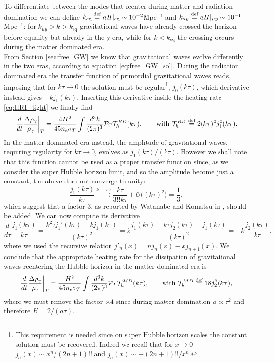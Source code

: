 To differentiate between the modes that reenter during matter and radiation domination we can define $k_\text{eq}\stackrel{\text{def}}{=} aH|_\text{eq}\sim 10^{-2}$Mpc$^{-1}$ and $k_{\mu y}\stackrel{\text{def}}{=} aH|_{\mu y}\sim 10^{-1}$Mpc$^{-1}$: for $k_{\mu y}>k>k_\text{eq}$ gravitational waves have already crossed the horizon before equality but already in the y-era, while for $k<k_\text{eq}$ the crossing occurs during the matter dominated era.\\ From Section \ref{sec:free_GW} we know that gravitational waves evolve differently in the two eras, according to equation \eqref{eq:free_GW_sol}. During the radiation dominated era the transfer function of primordial gravitational waves reads, imposing that for $k\tau\to0$ the solution must be regular\footnote{This requirement is needed since on super Hubble horizon scales the constant solution must be recovered. Indeed we recall that for $x\to0$ $j_n(x)\sim x^{n}/(2n+1)!!$ and $j_n(x)\sim -(2n+1)!!/x^{n}$.}, $ j_0(k\tau)$, which derivative
instead gives $-kj_1(k\tau)$. Inserting this derivative inside the heating rate \eqref{eq:HRI_tight} we finally find
\begin{equation}
    \frac{d}{dt}\frac{\Delta\rho_\gamma}{\rho_\gamma}\bigg|_T=\frac{4H^2}{45n_e\sigma_T}\int\frac{d^3k}{(2\pi)^3}\mathcal{P}_T\mathcal{T}_h^{RD}(k\tau),\qquad\text{with }\mathcal{T}_h^{RD}\stackrel{\text{def}}{=} 2(k\tau)^2j_1^2(k\tau).
\end{equation}
In the matter dominated era instead, the amplitude of gravitational waves, requiring regularity for $k\tau\to0$, evolves as $j_1(k\tau)/(k\tau)$.
However we shall note that this function cannot be used as a proper transfer function since, as we consider the super Hubble horizon limit, and so the amplitude become just a constant, the above does not converge to unity:
$$\frac{j_1(k\tau)}{k\tau}\xrightarrow{k\tau\to0}\frac{k\tau}{3!!k\tau}+\mathcal{O}\big((k\tau)^2\big)=\frac{1}{3},$$
which suggest that a factor $3$, as reported by Watanabe and Komatsu in \cite{Watanabe_2006}, should be added.  
We can now compute its derivative
$$\frac{d}{d\tau}\frac{j_1(k\tau)}{k\tau}=\frac{k^2\tau j_1'(k\tau)-kj_1(k\tau)}{(k\tau)^2}=k\frac{j_1(k\tau)-k\tau j_2(k\tau)-j_1(k\tau)}{(k\tau)^2}=-k \frac{j_2(k\tau)}{k\tau},$$
where we used the recursive relation $j'_n(x)=n j_n(x)-xj_{n+1}(x)$. We conclude that the appropriate heating rate for the dissipation of gravitational waves reentering the Hubble horizon in the matter dominated era is 
\begin{equation}
    \frac{d}{dt}\frac{\Delta\rho_\gamma}{\rho_\gamma}\bigg|_T=\frac{H^2}{45n_e\sigma_T}\int\frac{d^3k}{(2\pi)^3}\mathcal{P}_T\mathcal{T}_h^{MD}(k\tau),\qquad\text{with }\mathcal{T}_h^{MD}\stackrel{\text{def}}{=} 18j_2^2(k\tau),
\end{equation}
where we must remove the factor $\times 4$ since during matter domination $a\propto \tau^2$ and therefore $H=2/(a\tau)$.
